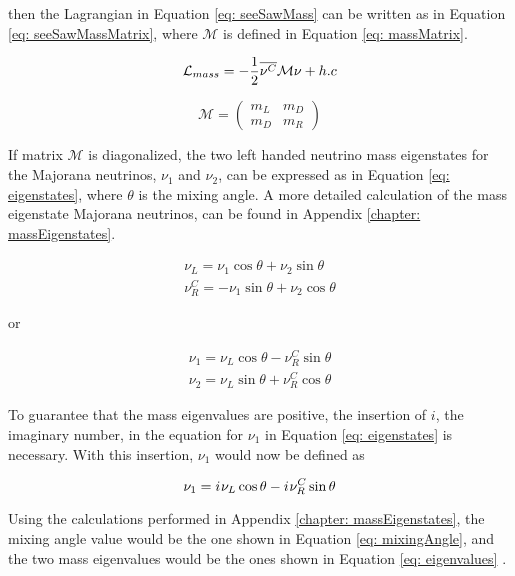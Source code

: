 then the Lagrangian in Equation \ref{eq: seeSawMass} can be written as in Equation \ref{eq: seeSawMassMatrix}, where $\mathcal{M}$ is defined in Equation \ref{eq: massMatrix}.

\begin{equation}\label{eq: seeSawMassMatrix}
\mathcal{L}_{mass} = -\frac{1}{2}\overline{\nu^{C}}\mathcal{M}\nu + h.c
\end{equation}

\begin{equation}\label{eq: massMatrix}
\mathcal{M} = \begin{pmatrix} m_{L}&m_{D}\\m_{D}&m_{R} \end{pmatrix}
\end{equation}

If matrix $\mathcal{M}$ is diagonalized, the two left handed neutrino mass eigenstates for the Majorana neutrinos, $\nu_{1}$ and $\nu_{2}$, can be expressed as in Equation \ref{eq: eigenstates}, where $\theta$ is the mixing angle. A more detailed calculation of the mass eigenstate Majorana neutrinos, can be found in Appendix \ref{chapter: massEigenstates}.

\begin{equation*}
\begin{split}
\nu_{L} = \nu_{1} \cos \theta + \nu_{2} \sin \theta \\
\nu_{R}^{C} = -\nu_{1} \sin \theta + \nu_{2} \cos \theta
\end{split}
\end{equation*}


or

\begin{equation} \label{eq: eigenstates}
\begin{split}										
\nu_{1} = \nu_{L} \cos \theta - \nu_{R}^{C} \sin \theta \\
\nu_{2} = \nu_{L} \sin \theta + \nu_{R}^{C} \cos \theta											
\end{split}
\end{equation}

To guarantee that the mass eigenvalues are positive, the insertion of $i$, the imaginary number, in the equation for $\nu_{1}$ in Equation \ref{eq: eigenstates} is necessary. With this insertion, $\nu_{1}$ would now be defined as

$$ \nu_{1} = {i\mkern1mu} \nu_{L} \cos \theta - {i\mkern1mu} \nu_{R}^{C} \sin \theta $$

Using the calculations performed in Appendix \ref{chapter: massEigenstates}, the mixing angle value would be the one shown in Equation \ref{eq: mixingAngle}, and the two mass eigenvalues would be the ones shown in Equation \ref{eq: eigenvalues} \cite{NeutrinoMass}.

